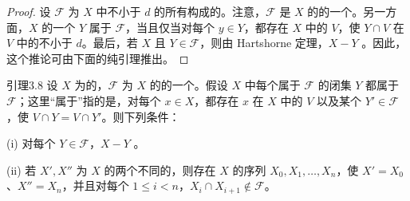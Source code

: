 \begin{proof}
设 $\mathcal F$ 为 $X$ 中不小于 $d$ 的所有构成的。注意，$\mathcal F$ 是 $X$ 的的一个。另一方面，$X$ 的一个 $Y$ 属于 $\mathcal F$，当且仅当对每个 $y\in Y$，都存在 $X$ 中的 $V$，使 $Y\cap V$ 在 $V$ 中的不小于 $d$。最后，若 $X$ 且 $Y\in\mathcal F$，则由 Hartshorne 定理，$X-Y$ 。因此，这个推论可由下面的纯引理推出。
\end{proof}
\begin{SGAresult}{引理}{3.8}
设 $X$ 为的，$\mathcal F$ 为 $X$ 的的一个。假设 $X$ 中每个属于 $\mathcal F$ 的闭集 $Y$ 都属于 $\mathcal F$；这里“属于”指的是，对每个 $x\in X$，都存在 $x$ 在 $X$ 中的 $V$ 以及某个 $Y'\in\mathcal F$，使 $V\cap Y=V\cap Y'$。则下列条件：

\textnormal{(i)} 对每个 $Y\in\mathcal F$，$X-Y$ 。

\textnormal{(ii)} 若 $X',X''$ 为 $X$ 的两个不同的，则存在 $X$ 的序列 $X_0,X_1,\ldots,X_n$，使 $X'=X_0$、$X''=X_n$，并且对每个 $1\le i<n$，$X_i\cap X_{i+1}\notin\mathcal F$。
\end{SGAresult}
